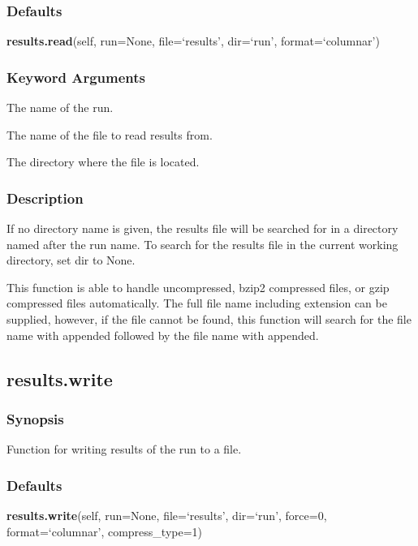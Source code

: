 \subsubsection{Defaults}

\textsf{\textbf{results.read}(self, run=None, file=`results', dir=`run', format=`columnar')}


\subsubsection{Keyword Arguments}


  The name of the run.

  The name of the file to read results from.

  The directory where the file is located.

\subsubsection{Description}

If no directory name is given, the results file will be searched for in a directory named
after the run name.  To search for the results file in the current working directory, set
dir to None.

This function is able to handle uncompressed, bzip2 compressed files, or gzip compressed
files automatically.  The full file name including extension can be supplied, however, if
the file cannot be found, this function will search for the file name with 
 appended
followed by the file name with 
 appended.


\newpage

\subsection{results.write}


\subsubsection{Synopsis}

Function for writing results of the run to a file.

\subsubsection{Defaults}

\textsf{\textbf{results.write}(self, run=None, file=`results', dir=`run', force=0, format=`columnar', compress\_type=1)}


